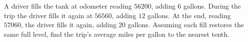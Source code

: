 A driver fills the tank at odometer reading $56200$, adding $6$ gallons. During the trip the driver fills it again at $56560$, adding $12$ gallons. At the end, reading $57060$, the driver fills it again, adding $20$ gallons. Assuming each fill restores the same full level, find the trip's average miles per gallon to the nearest tenth.
